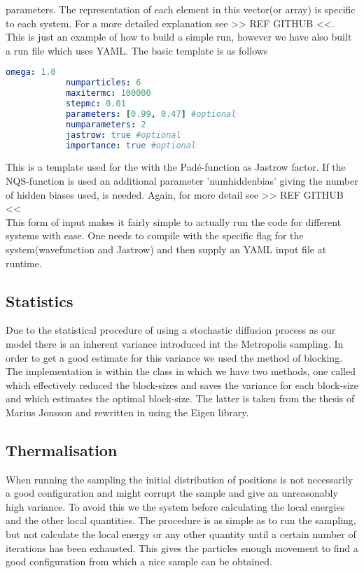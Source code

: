     parameters. The representation of each element in this vector(or
    array) is specific to each system. For a more detailed explanation see >>
    REF GITHUB <<. \\
    This is just an example of how to build a simple run, however we have also
    built a run file which uses YAML\cite{yaml}. The basic template is as
    follows
        \begin{lstlisting}[language=yaml]
            omega: 1.0
            numparticles: 6
            maxitermc: 100000
            stepmc: 0.01
            parameters: [0.99, 0.47] #optional
            numparameters: 2
            jastrow: true #optional
            importance: true #optional
        \end{lstlisting}
    This is a template used for the  with the
    Pad\'e-function as Jastrow factor. If the NQS-function is used an
    additional parameter 'numhiddenbias' giving the number of hidden biases
    used, is needed. Again, for more detail see >> REF GITHUB << \\ 
    This form of input makes it fairly simple to actually run the code for
    different systems with ease. One needs to compile with the specific flag
    for the system(wavefunction and Jastrow) and then supply an YAML input file
    at runtime.

\subsection{Statistics}
    Due to the statistical procedure of using a stochastic diffusion process as
    our model there is an inherent variance introduced int the Metropolis
    sampling. In order to get a good estimate for this variance we used the
    method of blocking\cite{blocking}. The implementation is within the class
     in which we have two methods, one called
     which effectively reduced the block-sizes and saves
    the variance for each block-size and  which
    estimates the optimal block-size. The latter is taken from the thesis of
    Marius Jonsson\cite{marisugithubblock} and rewritten in \CC using the Eigen
    library.

\subsection{Thermalisation}
    When running the sampling the initial distribution of positions is not
    necessarily a good configuration and might corrupt the sample and give an
    unreasonably high variance. To avoid this we  the system
    before calculating the local energies and the other local quantities. The
    procedure is as simple as to run the sampling, but not calculate the
    local energy or any other quantity until a certain number of iterations has
    been exhausted. This gives the particles enough movement to find a good
    configuration from which a nice sample can be obtained.

